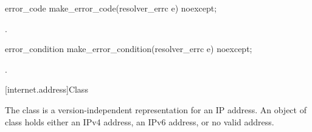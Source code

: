 \begin{itemdecl}
error_code make_error_code(resolver_errc e) noexcept;
\end{itemdecl}

\begin{itemdescr}
\pnum
\returns {}.
\end{itemdescr}

\begin{itemdecl}
error_condition make_error_condition(resolver_errc e) noexcept;
\end{itemdecl}

\begin{itemdescr}
\pnum
\returns {}.
\end{itemdescr}



[internet.address]{Class }

\pnum
The class  is a version-independent representation for an IP address. An object of class  holds either an IPv4 address, an IPv6 address, or no valid address.

